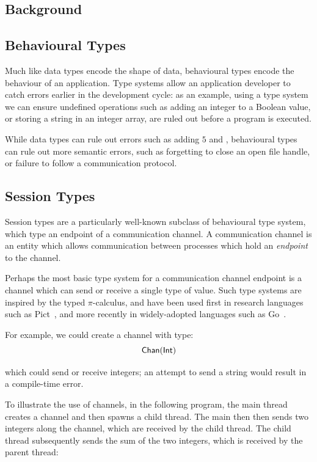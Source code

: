 \documentclass[
graybox,
envcountchap
]{svmult}
\begin{document}
\begin{bibunit}
  \section{Background}\label{sec:bt:background}
  \subsection{Behavioural Types}

  Much like data types encode the shape of data, behavioural types encode the
  behaviour of an application. Type systems allow an application developer to
  catch errors earlier in the development cycle: as an example, using a type
  system we can ensure undefined operations such as adding an integer to a
  Boolean value, or storing a string in an integer array, are ruled out before a
  program is executed.

  While data types can rule out errors such as adding $5$ and ,
  behavioural types can rule out more semantic errors, such as forgetting to
  close an open file handle, or failure to follow a communication protocol.

  \subsection{Session Types}
  Session types are a particularly well-known subclass of behavioural type
  system, which type an endpoint of a communication channel. A communication
  channel is an entity which allows communication between processes which hold
  an \emph{endpoint} to the channel.

  Perhaps the most basic type system for a communication channel endpoint is a
  channel which can send or receive a single type of value. Such type systems
  are inspired by the typed $\pi$-calculus, and have been used first in research
  languages such as Pict~\cite{PierceT00:pict}, and more recently in
  widely-adopted languages such as Go~\cite{DonovanK15:go}.

  For example, we could create a channel with type:
  \[
    \mathsf{Chan}(\mathsf{Int})
  \]


  which could send or receive integers; an attempt to send a string would result
  in a compile-time error.

  To illustrate the use of channels, in the following program, the
  main thread creates a channel and then spawns a child thread. The main
  then then sends two integers along the channel, which are received by the
  child thread. The child thread subsequently sends the sum of the two integers,
  which is received by the parent thread:


\end{bibunit}
\end{document}
